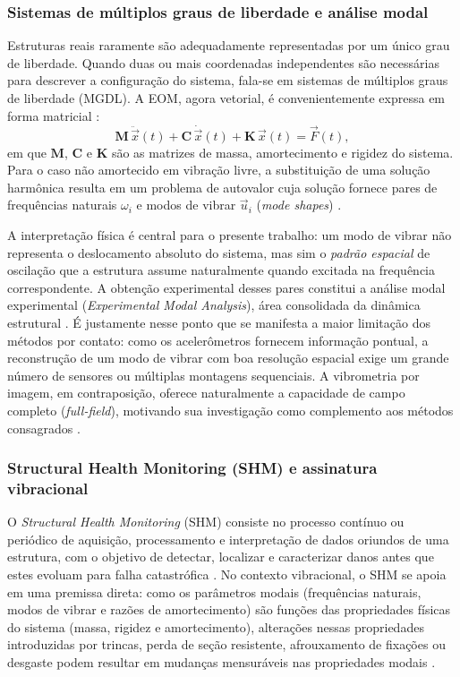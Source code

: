\documentclass[a4paper,10pt,twocolumn]{article}
\begin{document}
\subsubsection{Sistemas de múltiplos graus de liberdade e análise modal}

Estruturas reais raramente são adequadamente representadas por um único grau de liberdade. Quando duas ou mais coordenadas independentes são necessárias para descrever a configuração do sistema, fala-se em sistemas de múltiplos graus de liberdade (MGDL). A EOM, agora vetorial, é convenientemente expressa em forma matricial \cite{Downey2026, Rao2010}:
\begin{equation}
    \mathbf{M}\,\ddot{\vec{x}}(t) + \mathbf{C}\,\dot{\vec{x}}(t) + \mathbf{K}\,\vec{x}(t) = \vec{F}(t),
    \label{eq:eom_mdof}
\end{equation}
em que $\mathbf{M}$, $\mathbf{C}$ e $\mathbf{K}$ são as matrizes de massa, amortecimento e rigidez do sistema. Para o caso não amortecido em vibração livre, a substituição de uma solução harmônica resulta em um problema de autovalor cuja solução fornece pares de frequências naturais $\omega_i$ e modos de vibrar $\vec{u}_i$ (\textit{mode shapes}) \cite{Downey2026}.

A interpretação física é central para o presente trabalho: um modo de vibrar não representa o deslocamento absoluto do sistema, mas sim o \textit{padrão espacial} de oscilação que a estrutura assume naturalmente quando excitada na frequência correspondente. A obtenção experimental desses pares constitui a análise modal experimental (\textit{Experimental Modal Analysis}), área consolidada da dinâmica estrutural \cite{Ewins2000}. É justamente nesse ponto que se manifesta a maior limitação dos métodos por contato: como os acelerômetros fornecem informação pontual, a reconstrução de um modo de vibrar com boa resolução espacial exige um grande número de sensores ou múltiplas montagens sequenciais. A vibrometria por imagem, em contraposição, oferece naturalmente a capacidade de campo completo (\textit{full-field}), motivando sua investigação como complemento aos métodos consagrados \cite{robotcamera2025}.

\subsubsection{Structural Health Monitoring (SHM) e assinatura vibracional}

O \textit{Structural Health Monitoring} (SHM) consiste no processo contínuo ou periódico de aquisição, processamento e interpretação de dados oriundos de uma estrutura, com o objetivo de detectar, localizar e caracterizar danos antes que estes evoluam para falha catastrófica \cite{Doebling1998}. No contexto vibracional, o SHM se apoia em uma premissa direta: como os parâmetros modais (frequências naturais, modos de vibrar e razões de amortecimento) são funções das propriedades físicas do sistema (massa, rigidez e amortecimento), alterações nessas propriedades introduzidas por trincas, perda de seção resistente, afrouxamento de fixações ou desgaste podem resultar em mudanças mensuráveis nas propriedades modais \cite{Doebling1998}.
\end{document}

